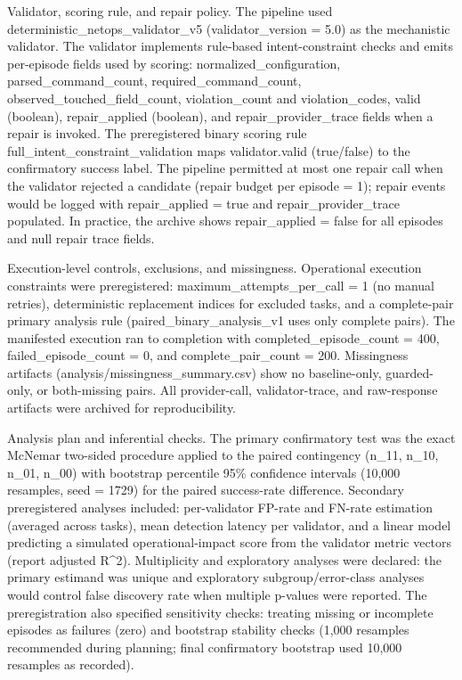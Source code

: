 \documentclass[conference]{IEEEtran}
\begin{document}
Validator, scoring rule, and repair policy. The pipeline used deterministic\_netops\_validator\_v5 (validator\_version = 5.0) as the mechanistic validator. The validator implements rule-based intent-constraint checks and emits per-episode fields used by scoring: normalized\_configuration, parsed\_command\_count, required\_command\_count, observed\_touched\_field\_count, violation\_count and violation\_codes, valid (boolean), repair\_applied (boolean), and repair\_provider\_trace fields when a repair is invoked. The preregistered binary scoring rule full\_intent\_constraint\_validation maps validator.valid (true/false) to the confirmatory success label. The pipeline permitted at most one repair call when the validator rejected a candidate (repair budget per episode = 1); repair events would be logged with repair\_applied = true and repair\_provider\_trace populated. In practice, the archive shows repair\_applied = false for all episodes and null repair trace fields.

Execution-level controls, exclusions, and missingness. Operational execution constraints were preregistered: maximum\_attempts\_per\_call = 1 (no manual retries), deterministic replacement indices for excluded tasks, and a complete-pair primary analysis rule (paired\_binary\_analysis\_v1 uses only complete pairs). The manifested execution ran to completion with completed\_episode\_count = 400, failed\_episode\_count = 0, and complete\_pair\_count = 200. Missingness artifacts (analysis/missingness\_summary.csv) show no baseline-only, guarded-only, or both-missing pairs. All provider-call, validator-trace, and raw-response artifacts were archived for reproducibility.

Analysis plan and inferential checks. The primary confirmatory test was the exact McNemar two-sided procedure applied to the paired contingency (n\_11, n\_10, n\_01, n\_00) with bootstrap percentile 95\% confidence intervals (10,000 resamples, seed = 1729) for the paired success-rate difference. Secondary preregistered analyses included: per-validator FP-rate and FN-rate estimation (averaged across tasks), mean detection latency per validator, and a linear model predicting a simulated operational-impact score from the validator metric vectors (report adjusted R\textasciicircum{}2). Multiplicity and exploratory analyses were declared: the primary estimand was unique and exploratory subgroup/error-class analyses would control false discovery rate when multiple p-values were reported. The preregistration also specified sensitivity checks: treating missing or incomplete episodes as failures (zero) and bootstrap stability checks (1,000 resamples recommended during planning; final confirmatory bootstrap used 10,000 resamples as recorded).
\end{document}
